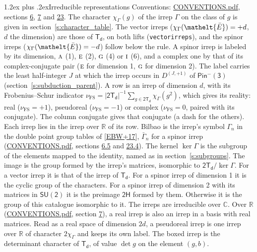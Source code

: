 \documentclass[10pt,a4paper]{article}
\makeatletter
\renewcommand\section{\@startsection{section}{1}{\z@}{-3ex plus -1ex minus -.2ex}%
  {1.2ex plus .2ex}{\normalfont\large\sffamily\bfseries\color{parttitle}}}
\numberwithin{equation}{section}
\newcommand{\eltfont}[1]{{\let\sigma\eltsigma\mathelt{#1}}}
\newcommand{\grp}[1]{\mathsf{#1}}
\newcommand{\irr}[1]{\text{\normalfont\scshape #1}}
\newcommand{\elt}[1]{\eltfont{#1}}
\newcommand{\irrJp}[2]{D^{(#1,#2)}}
\newcommand{\irchar}[1]{\chi_{#1}}
\newcommand{\fsind}{\nu_{\mathrm{FS}}}
\newcommand{\barred}[1]{\bar{#1}}
\makeatother
\begin{document}
\section{Irreducible representations}\label{s:irreps}
Conventions: \href{../../CONVENTIONS.pdf}{CONVENTIONS.pdf}, sections \href{../../../rotation/CONVENTIONS.pdf\#conv.6}{6}, \href{../../../rotation/CONVENTIONS.pdf\#conv.7}{7} and \href{../../CONVENTIONS.pdf\#conv.23}{23}.
\leavevmode\label{n:function.character}\label{n:irrep.Gamma}The character $\irchar{\Gamma}(g)$ of the irrep $\Gamma$ on the class of $g$ is given in section~\ref{s:character_table}. \label{n:index.dimension}The vector irreps ($\irchar{\Gamma}(\elt{\barred{E}}) = +d$, $d$ the dimension) are those of \href{../../../rotation/data/pdf/Td.pdf}{$\grp{T_{d}}$}, on both lifts (\texttt{vectorirreps}), and the spinor irreps ($\irchar{\Gamma}(\elt{\barred{E}}) = -d$) follow below the rule. A spinor irrep is labeled by its dimension, $\irr{a}$ (1), $\irr{e}$ (2), $\irr{g}$ (4) or $\irr{i}$ (6), and a complex one by that of its complex-conjugate pair ($\irr{e}$ for dimension 1, $\irr{g}$ for dimension 2). The label carries the least half-integer $J$ at which the irrep occurs in $\irrJp{J}{+1}$ of $\grp{Pin^{-}(3)}$ (section~\ref{s:subduction_parent}).
\leavevmode\label{n:index.frobenius}\label{n:head.irrep}\label{n:head.reality}A row is an irrep of dimension $d$, with its Frobenius--Schur indicator $\fsind = |\grp{2T_{d}}|^{-1}\allowbreak\sum_{g\in\grp{2T_{d}}}\irchar{\Gamma}(g^2)$, which gives its reality: real ($\fsind = +1$), pseudoreal ($\fsind = -1$) or complex ($\fsind = 0$, paired with its conjugate). \label{n:head.conjugate}The column conjugate gives that conjugate (a dash for the others). \label{n:head.over.real}Each irrep lies in the irrep over $\mathbb{R}$ of its row. \label{n:head.bilbao}\label{n:irrep.alias.gamma}Bilbao is the irrep's symbol $\Gamma_n$ in the double point group tables of [\href{../../../REFERENCES.pdf\#ref.EBW+17}{EBW+17}], $\bar{\Gamma}_n$ for a spinor irrep (\href{../../CONVENTIONS.pdf}{CONVENTIONS.pdf}, sections \href{../../../rotation/CONVENTIONS.pdf\#conv.6.5}{6.5} and \href{../../CONVENTIONS.pdf\#conv.23.4}{23.4}). \label{n:head.kernel}The kernel $\ker\Gamma$ is the subgroup of the elements mapped to the identity, named as in section~\ref{s:subgroups}. \label{n:head.image}The image is the group formed by the irrep's matrices, isomorphic to $\grp{2T_{d}}/\ker\Gamma$. For a vector irrep it is that of the irrep of \href{../../../rotation/data/pdf/Td.pdf}{$\grp{T_{d}}$}. For a spinor irrep of dimension 1 it is the cyclic group of the characters. For a spinor irrep of dimension 2 with its matrices in $\grp{SU(2)}$ it is the preimage $\grp{2H}$ formed by them. Otherwise it is the group of this catalogue isomorphic to it. The irreps are irreducible over $\mathbb{C}$. Over $\mathbb{R}$ (\href{../../CONVENTIONS.pdf}{CONVENTIONS.pdf}, section \href{../../../rotation/CONVENTIONS.pdf\#conv.7}{7}), a real irrep is also an irrep in a basis with real matrices. Read as a real space of dimension $2d$, a pseudoreal irrep is one irrep over $\mathbb{R}$ of character $2\irchar{\Gamma}$ and keeps its own label. \label{n:mark.determinant}The boxed irrep is the determinant character of \href{../../../rotation/data/pdf/Td.pdf}{$\grp{T_{d}}$}, of value $\det g$ on the element $(g, b)$.
\end{document}
